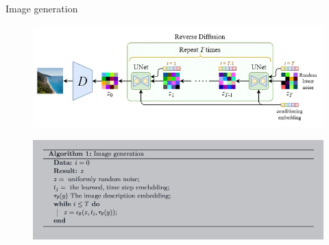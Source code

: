 \documentclass[8pt]{beamer}
\begin{document}
\begin{frame}{Image generation}
   \begin{figure}
       \includegraphics[scale=0.35]{images/diffusion_process_diagram}
       \label{fig:diffusion_process_diagram}
   \end{figure}
   \begin{figure}
       \includegraphics[scale=0.18]{images/image_generation_algorithm}
       \label{fig:image_generation_algorithm}
   \end{figure}
   \cite{steins}
\end{frame}
\end{document}
